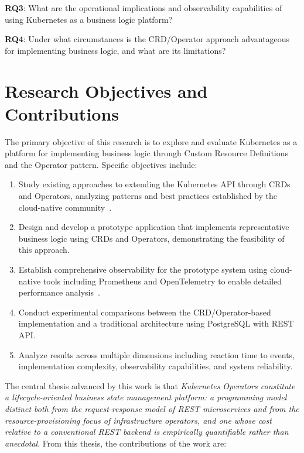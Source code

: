 \textbf{RQ3}: What are the operational implications and observability capabilities of using Kubernetes as a business logic platform?

\textbf{RQ4}: Under what circumstances is the CRD/Operator approach advantageous for implementing business logic, and what are its limitations?

\section{Research Objectives and Contributions}

The primary objective of this research is to explore and evaluate Kubernetes as a platform for implementing business logic through Custom Resource Definitions and the Operator pattern. Specific objectives include:

\begin{enumerate}
    \item Study existing approaches to extending the Kubernetes API through CRDs and Operators, analyzing patterns and best practices established by the cloud-native community~\cite{ibryam2020, hausenblas2019}.
    
    \item Design and develop a prototype application that implements representative business logic using CRDs and Operators, demonstrating the feasibility of this approach.
    
    \item Establish comprehensive observability for the prototype system using cloud-native tools including Prometheus and OpenTelemetry to enable detailed performance analysis~\cite{prometheus, opentelemetry, prometheus_cloud_native_monitoring}.
    
    \item Conduct experimental comparisons between the CRD/Operator-based implementation and a traditional architecture using PostgreSQL with REST API\@.
    
    \item Analyze results across multiple dimensions including reaction time to events, implementation complexity, observability capabilities, and system reliability.
\end{enumerate}

The central thesis advanced by this work is that \emph{Kubernetes Operators constitute a lifecycle-oriented business state management platform: a programming model distinct both from the request-response model of REST microservices and from the resource-provisioning focus of infrastructure operators, and one whose cost relative to a conventional REST backend is empirically quantifiable rather than anecdotal}. From this thesis, the contributions of the work are:

